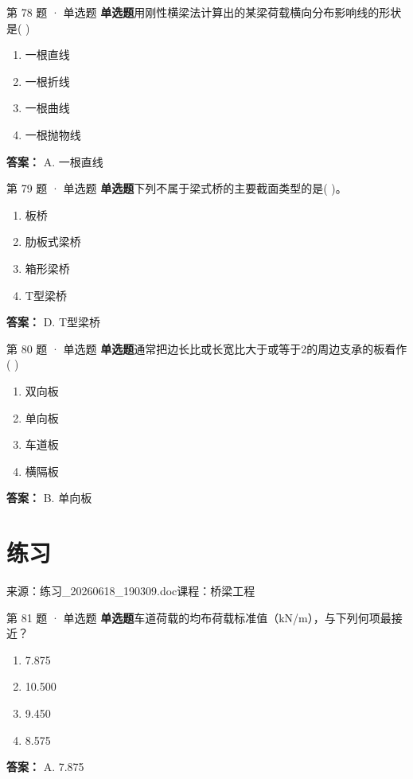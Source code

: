 \documentclass[UTF8,zihao=-4,openany]{ctexbook}
\newenvironment{choices}{\begin{enumerate}[label=\Alph*.,leftmargin=9mm,labelsep=3mm,itemsep=2pt,topsep=4pt]}{\end{enumerate}}
\newcommand{\qtype}[1]{\textcolor{brand}{\sffamily\bfseries #1}}
\newcommand{\sourcefile}[1]{\textcolor{muted}{\small\sffamily 来源：#1}}
\begin{document}
\begin{questionbox}{第 78 题 · 单选题}
\qtype{单选题}\quad 用刚性横梁法计算出的某梁荷载横向分布影响线的形状是( )
\begin{choices}
\item 一根直线
\item 一根折线
\item 一根曲线
\item 一根抛物线
\end{choices}
\begin{answerbox}
\textbf{答案：} A. 一根直线
\end{answerbox}
\end{questionbox}

\begin{questionbox}{第 79 题 · 单选题}
\qtype{单选题}\quad 下列不属于梁式桥的主要截面类型的是( )。
\begin{choices}
\item 板桥
\item 肋板式梁桥
\item 箱形梁桥
\item T型梁桥
\end{choices}
\begin{answerbox}
\textbf{答案：} D. T型梁桥
\end{answerbox}
\end{questionbox}

\begin{questionbox}{第 80 题 · 单选题}
\qtype{单选题}\quad 通常把边长比或长宽比大于或等于2的周边支承的板看作( )
\begin{choices}
\item 双向板
\item 单向板
\item 车道板
\item 横隔板
\end{choices}
\begin{answerbox}
\textbf{答案：} B. 单向板
\end{answerbox}
\end{questionbox}

\chapter{练习}

\sourcefile{练习\_20260618\_190309.doc}\quad \textcolor{muted}{\small\sffamily 课程：桥梁工程}

\begin{questionbox}{第 81 题 · 单选题}
\qtype{单选题}\quad 车道荷载的均布荷载标准值（kN/m），与下列何项最接近？
\begin{choices}
\item 7.875
\item 10.500
\item 9.450
\item 8.575
\end{choices}
\begin{answerbox}
\textbf{答案：} A. 7.875
\end{answerbox}
\end{questionbox}
\end{document}
